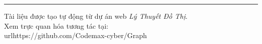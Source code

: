 \documentclass[12pt,a4paper]{article}
\begin{document}
\vspace{2em}
\hrule
\vspace{0.8em}
{\small\color{gray}
Tài liệu được tạo tự động từ dự án web \textit{Lý Thuyết Đồ Thị}.\\
Xem trực quan hóa tương tác tại: \\url{https://github.com/Codemax-cyber/Graph}
}
\end{document}
